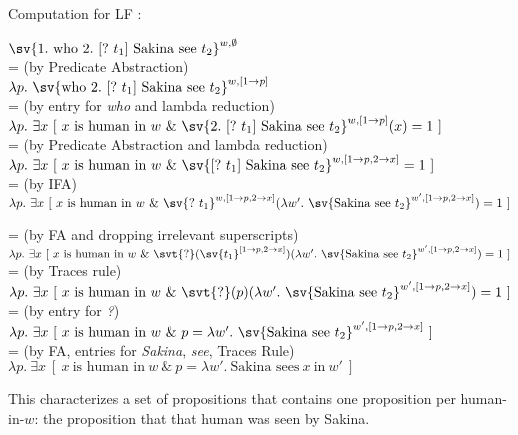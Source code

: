 \noindent
\ex Computation for LF \Last:\label{ex:wh-comp}\\
\begin{minipage}{1.5\textwidth}
$\sv{1.\ \text{who}\ 2.\ [?\ t_{1}]\ \text{Sakina see}\ t_{2}}^{w,\emptyset}$\\
{\small = (by Predicate Abstraction)}\\
$\lambda p.\ \sv{\text{who}\ 2.\ [?\ t_{1}]\ \text{Sakina
    see}\ t_{2}}^{w,[1\rightarrow p]}$\\
{\small = (by entry for \emph{who} and lambda reduction)}\\
$\lambda p.\ \exists x\ [\ x\ \text{is human in}\ w\ \&\ \sv{2.\ [?\ t_{1}]\ \text{Sakina
    see}\ t_{2}}^{w,[1\rightarrow p]}(x) = 1\ ]$\\
{\small = (by Predicate Abstraction and lambda reduction)}\\
$\lambda p.\ \exists x\ [\ x\ \text{is human in}\ w\ \&\ \sv{[?\ t_{1}]\ \text{Sakina
    see}\ t_{2}}^{w,[1\rightarrow p,2\rightarrow x]} = 1\ ]$\\
{\small = (by IFA)}\\
$\lambda p.\ \exists x\ [\ x\ \text{is human
  in}\ w\ \&\ \sv{?\ t_{1}}^{w,[1\rightarrow p,2\rightarrow x]}(\lambda w'.\ \sv{\text{Sakina
    see}\ t_{2}}^{w',[1\rightarrow p,2\rightarrow x]}) = 1\ ]$
\end{minipage}
\clearpage\begin{minipage}{1.5\textwidth}
{\small = (by FA and dropping irrelevant superscripts)}\\
$\lambda p.\ \exists x\ [\ x\ \text{is human
  in}\ w\ \&\ \svt{?}(\sv{t_{1}}^{[1\rightarrow p,2\rightarrow x]})(\lambda w'.\ \sv{\text{Sakina
    see}\ t_{2}}^{w',[1\rightarrow p,2\rightarrow x]}) = 1\ ]$\\
{\small = (by Traces rule)}\\
$\lambda p.\ \exists x\ [\ x\ \text{is human
  in}\ w\ \&\ \svt{?}(p)(\lambda w'.\ \sv{\text{Sakina
    see}\ t_{2}}^{w',[1\rightarrow p,2\rightarrow x]}) = 1\ ]$\\
{\small = (by entry for \emph{?})}\\
$\lambda p.\ \exists x\ [\ x\ \text{is human
  in}\ w\ \&\ p = \lambda w'.\ \sv{\text{Sakina
    see}\ t_{2}}^{w',[1\rightarrow p,2\rightarrow x]}\ ]$\\
{\small = (by FA, entries for \emph{Sakina}, \emph{see}, Traces Rule)}\\
$\lambda p.\ \exists x\ [\ x\ \text{is human
  in}\ w\ \&\ p = \lambda w'.\ \text{Sakina
  sees}\ x\ \text{in}\ w'\ ]$\\
\end{minipage}
\xe
%
%
This characterizes a set of propositions that contains one proposition per
human-in-$w$: the proposition that that human was seen by Sakina.

